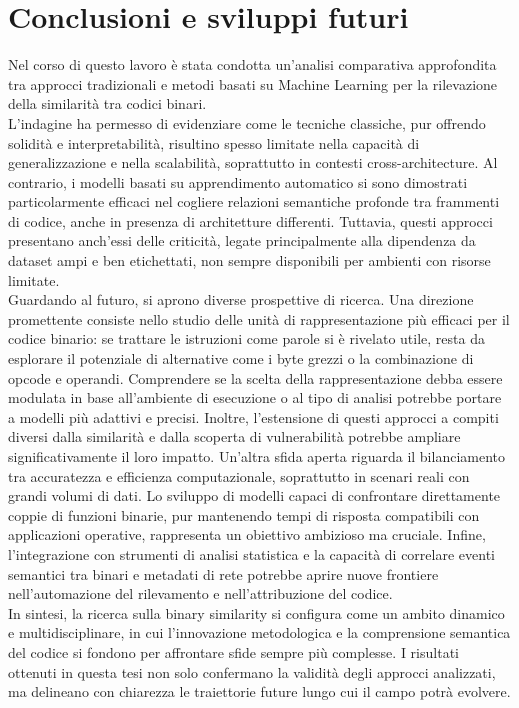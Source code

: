 \documentclass[12pt,a4paper,openright,twoside]{report}
\begin{document}
\clearpage{\pagestyle{empty}\cleardoublepage}

\chapter{Conclusioni e sviluppi futuri}\label{Cap5}

Nel corso di questo lavoro è stata condotta un’analisi comparativa approfondita tra approcci tradizionali e metodi basati su Machine Learning per la rilevazione della similarità tra codici binari.\\
L’indagine ha permesso di evidenziare come le tecniche classiche, pur offrendo solidità e interpretabilità, risultino spesso limitate nella capacità di generalizzazione e nella scalabilità, soprattutto in contesti cross-architecture. Al contrario, i modelli basati su apprendimento automatico si sono dimostrati particolarmente efficaci nel cogliere relazioni semantiche profonde tra frammenti di codice, anche in presenza di architetture differenti. Tuttavia, questi approcci presentano anch’essi delle criticità, legate principalmente alla dipendenza da dataset ampi e ben etichettati, non sempre disponibili per ambienti con risorse limitate.\\
Guardando al futuro, si aprono diverse prospettive di ricerca. Una direzione promettente consiste nello studio delle unità di rappresentazione più efficaci per il codice binario: se trattare le istruzioni come parole si è rivelato utile, resta da esplorare il potenziale di alternative come i byte grezzi o la combinazione di opcode e operandi. Comprendere se la scelta della rappresentazione debba essere modulata in base all’ambiente di esecuzione o al tipo di analisi potrebbe portare a modelli più adattivi e precisi. Inoltre, l’estensione di questi approcci a compiti diversi dalla similarità e dalla scoperta di vulnerabilità potrebbe ampliare significativamente il loro impatto. Un’altra sfida aperta riguarda il bilanciamento tra accuratezza e efficienza computazionale, soprattutto in scenari reali con grandi volumi di dati. Lo sviluppo di modelli capaci di confrontare direttamente coppie di funzioni binarie, pur mantenendo tempi di risposta compatibili con applicazioni operative, rappresenta un obiettivo ambizioso ma cruciale. Infine, l’integrazione con strumenti di analisi statistica e la capacità di correlare eventi semantici tra binari e metadati di rete potrebbe aprire nuove frontiere nell’automazione del rilevamento e nell’attribuzione del codice.\\
In sintesi, la ricerca sulla binary similarity si configura come un ambito dinamico e multidisciplinare, in cui l’innovazione metodologica e la comprensione semantica del codice si fondono per affrontare sfide sempre più complesse. I risultati ottenuti in questa tesi non solo confermano la validità degli approcci analizzati, ma delineano con chiarezza le traiettorie future lungo cui il campo potrà evolvere.
\end{document}
